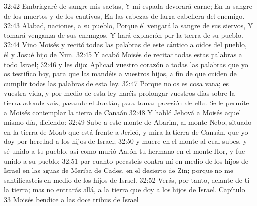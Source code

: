 32:42 Embriagaré de sangre mis saetas,  
Y mi espada devorará carne;  
En la sangre de los muertos y de los cautivos,  
En las cabezas de larga cabellera del enemigo.  
32:43 Alabad, naciones, a su pueblo, 
Porque él vengará la sangre de sus siervos, 
Y tomará venganza de sus enemigos,  
Y hará expiación por la tierra de su pueblo.  
32:44 Vino Moisés y recitó todas las palabras de este cántico a oídos del pueblo, él y Josué hijo de Nun.  
32:45 Y acabó Moisés de recitar todas estas palabras a todo Israel;  
32:46 y les dijo: Aplicad vuestro corazón a todas las palabras que yo os testifico hoy, para que las mandéis a vuestros hijos, a fin de que cuiden de cumplir todas las palabras de esta ley.  
32:47 Porque no os es cosa vana; es vuestra vida, y por medio de esta ley haréis prolongar vuestros días sobre la tierra adonde vais, pasando el Jordán, para tomar posesión de ella.  
Se le permite a Moisés contemplar la tierra de Canaán  
32:48 Y habló Jehová a Moisés aquel mismo día, diciendo:  
32:49 Sube a este monte de Abarim, al monte Nebo, situado en la tierra de Moab que está frente a Jericó, y mira la tierra de Canaán, que yo doy por heredad a los hijos de Israel;  
32:50 y muere en el monte al cual subes, y sé unido a tu pueblo, así como murió Aarón tu hermano en el monte Hor, y fue unido a su pueblo;  
32:51 por cuanto pecasteis contra mí en medio de los hijos de Israel en las aguas de Meriba de Cades, en el desierto de Zin; porque no me santificasteis en medio de los hijos de Israel.  
32:52 Verás, por tanto, delante de ti la tierra; mas no entrarás allá, a la tierra que doy a los hijos de Israel.  
Capítulo 33 
Moisés bendice a las doce tribus de Israel  

